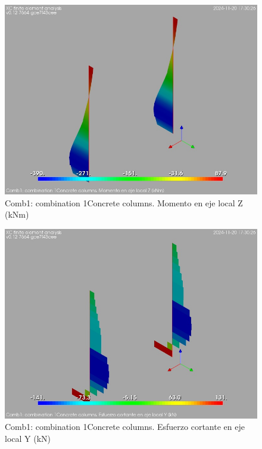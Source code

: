 \begin{figure}[ht]
\begin{center}
\includegraphics[width=\linewidth]{results/graphics/resSimplLC/LS1columnZconcrMz.png}
\caption{Comb1: combination 1Concrete columns. Momento en eje local Z (kNm)}
\label{LS1columnZconcrMz}
\end{center}
\end{figure}
\begin{figure}[ht]
\begin{center}
\includegraphics[width=\linewidth]{results/graphics/resSimplLC/LS1columnZconcrVy.png}
\caption{Comb1: combination 1Concrete columns. Esfuerzo cortante en eje local Y (kN)}
\label{LS1columnZconcrVy}
\end{center}
\end{figure}
